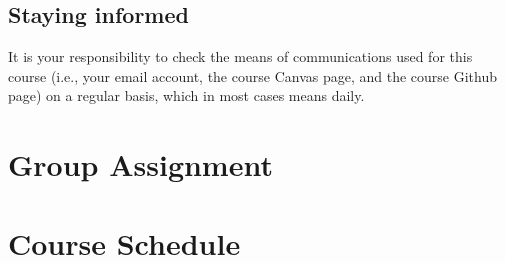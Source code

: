 \documentclass[a4paper,10pt,twocolumn]{report}
\begin{document}
	\section{Staying informed}
	It is your responsibility to check the means of communications used for this course (i.e., your email account, the course Canvas page, and the course Github page) on a regular basis, which in most cases means daily. 
	

	\chapter{Group Assignment}
	\label{sec:groupassignment}
	
	
	
	\chapter{Course Schedule}
	
	
	
	
	
	
	
	
\end{document}
